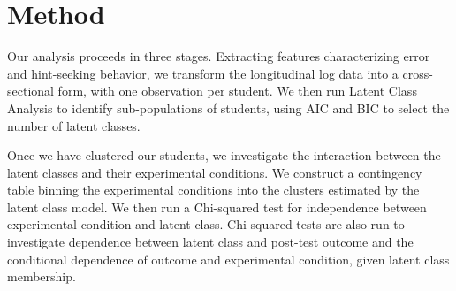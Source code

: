 \documentclass{edm_template}
\begin{document}

 
\section{Method}
\label{sec:method}

Our analysis proceeds in three stages. Extracting features characterizing error and hint-seeking behavior, we transform the longitudinal log data into a cross-sectional form, with one observation per student. We then run Latent Class Analysis to identify sub-populations of students, using AIC and BIC to select the number of latent classes. 

Once we have clustered our students, we investigate the interaction between the latent classes and their experimental conditions. We construct a contingency table binning the experimental conditions into the clusters estimated by the latent class model. We then run a Chi-squared test for independence between experimental condition and latent class. Chi-squared tests are also run to investigate dependence between latent class and post-test outcome and the conditional dependence of outcome and experimental condition, given latent class membership.
\end{document}
